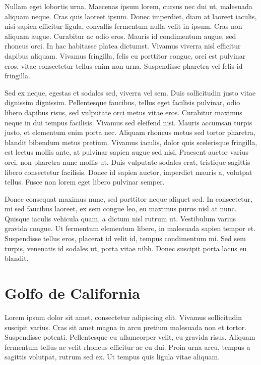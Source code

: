 \documentclass[
]{article}
\begin{document}
Nullam eget lobortis urna. Maecenas ipsum lorem, cursus nec dui ut, malesuada aliquam neque. Cras quis laoreet ipsum. Donec imperdiet, diam at laoreet iaculis, nisi sapien efficitur ligula, convallis fermentum nulla velit in ipsum. Cras non aliquam augue. Curabitur ac odio eros. Mauris id condimentum augue, sed rhoncus orci. In hac habitasse platea dictumst. Vivamus viverra nisl efficitur dapibus aliquam. Vivamus fringilla, felis eu porttitor congue, orci est pulvinar eros, vitae consectetur tellus enim non urna. Suspendisse pharetra vel felis id fringilla.

Sed ex neque, egestas et sodales sed, viverra vel sem. Duis sollicitudin justo vitae dignissim dignissim. Pellentesque faucibus, tellus eget facilisis pulvinar, odio libero dapibus risus, sed vulputate orci metus vitae eros. Curabitur maximus neque in dui tempus facilisis. Vivamus sed eleifend nisi. Mauris accumsan turpis justo, et elementum enim porta nec. Aliquam rhoncus metus sed tortor pharetra, blandit bibendum metus pretium. Vivamus iaculis, dolor quis scelerisque fringilla, est lectus mollis ante, at pulvinar sapien augue sed nisi. Praesent auctor varius orci, non pharetra nunc mollis ut. Duis vulputate sodales erat, tristique sagittis libero consectetur facilisis. Donec id sapien auctor, imperdiet mauris a, volutpat tellus. Fusce non lorem eget libero pulvinar semper.

Donec consequat maximus nunc, sed porttitor neque aliquet sed. In consectetur, mi sed faucibus laoreet, ex sem congue leo, eu maximus purus nisl at nunc. Quisque iaculis vehicula quam, a dictum nisl rutrum ut. Vestibulum varius gravida congue. Ut fermentum elementum libero, in malesuada sapien tempor et. Suspendisse tellus eros, placerat id velit id, tempus condimentum mi. Sed sem turpis, venenatis id sodales ut, porta vitae nibh. Donec suscipit porta lacus eu blandit.

\hypertarget{golfo-de-california}{%
\section{Golfo de California}\label{golfo-de-california}}

Lorem ipsum dolor sit amet, consectetur adipiscing elit. Vivamus sollicitudin suscipit varius. Cras sit amet magna in arcu pretium malesuada non et tortor. Suspendisse potenti. Pellentesque eu ullamcorper velit, eu gravida risus. Aliquam fermentum tellus ac velit rhoncus efficitur ac eu dui. Proin urna arcu, tempus a sagittis volutpat, rutrum sed ex. Ut tempus quis ligula vitae aliquam.
\end{document}
